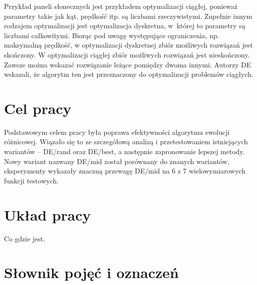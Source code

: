 \documentclass[a4paper,onecolumn,oneside,11pt,wide,floatssmall]{mwrep}
\theoremstyle{definition}
\theoremstyle{plain}%
\theoremstyle{remark}
\begin{document}
Przykład paneli słonecznych jest przykładem optymalizacji ciągłej, ponieważ parametry takie jak kąt,
prędkość itp. są liczbami rzeczywistymi. Zupełnie innym rodzajem optymalizacji jest optymalizacja 
dyskretna, w której to parametry są liczbami całkowitymi. Biorąc pod uwagę występujące ograniczenia,
np. maksymalną prędkość, w optymalizacji dyskretnej zbiór możliwych rozwiązań jest skończony. 
W optymalizacji ciągłej zbiór możliwych rozwiązań jest nieskończony. Zawsze można wskazać rozwiązanie 
leżące pomiędzy dwoma innymi. Autorzy DE wskazali, że algorytm ten jest przeznaczony do 
optymalizacji problemów ciągłych. \cite{storn}

\section{Cel pracy}

Podstawowym celem pracy była poprawa efektywności algorytmu ewolucji różnicowej.
Wiązało się to ze szczegółową analizą i przetestowaniem istniejących wariantów -- DE/rand oraz DE/best,
a następnie zapronowanie lepszej metody. Nowy wariant nazwany DE/mid został porównany 
do znanych wariantów, eksperymenty wykazały znaczną przewagę
DE/mid na 6 z 7 wielowymiarowych funkcji testowych.

\section{Układ pracy}

Co gdzie jest.

\section{Słownik pojęć i oznaczeń}
\end{document}
